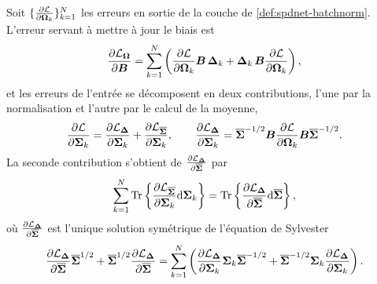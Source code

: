 \begin{proposition}
\label{prop:spdnet-batchnorm-backprop}
  Soit $\{\err{\loss}{\bnout_\iobs}\}_{\iobs=1}^{\Nobs}$ les erreurs en
  sortie de la couche de \cref{def:spdnet-batchnorm}. L'erreur servant à mettre
  à jour le biais est
  \begin{equation}
    \err{\loss_{\bnout}}{\Covbias}
    =
    \sum_{\iobs=1}^{\Nobs}
    \left(
      \err{\loss}{\bnout_\iobs}\Covbias\,\bnnorm_\iobs
      +
      \bnnorm_\iobs\,\Covbias\err{\loss}{\bnout_\iobs}
    \right),
    \label{eq:spdnet-backprop-biais}
  \end{equation}
  et les erreurs de l'entrée se décomposent en deux contributions, l'une par la
  normalisation et l'autre par le calcul de la moyenne,
  \begin{equation}
    \err{\loss}{\MCov_\iobs}
    =
    \err{\loss_{\bnnorm}}{\MCov_\iobs}
    +
    \err{\loss_{\Fmean}}{\MCov_\iobs},
    \qquad
    \err{\loss_{\bnnorm}}{\MCov_\iobs}
    =
    \Fmean^{-1/2}\Covbias\err{\loss}{\bnout_\iobs}\Covbias\Fmean^{-1/2}.
    \label{eq:spdnet-backprop-entree}
  \end{equation}
  La seconde contribution s'obtient de $\err{\loss_{\bnnorm}}{\Fmean}$ par
  \begin{equation}
    \sum_{\iobs=1}^{\Nobs}\trace{\err{\loss_{\Fmean}}{\MCov_\iobs}\diff\MCov_\iobs}
    =
    \trace{\err{\loss_{\bnnorm}}{\Fmean}\diff\Fmean},
    \label{eq:spdnet-backprop-moyenne}
  \end{equation}
  où $\err{\loss_{\bnnorm}}{\Fmean}$ est l'unique solution symétrique de
  l'équation de Sylvester
  \begin{equation}
    \err{\loss_{\bnnorm}}{\Fmean}\Fmean^{1/2}
    +
    \Fmean^{1/2}\err{\loss_{\bnnorm}}{\Fmean}
    =
    \sum_{\iobs=1}^{\Nobs}
    \left(
      \err{\loss_{\bnnorm}}{\MCov_\iobs}\MCov_\iobs\Fmean^{-1/2}
      +
      \Fmean^{-1/2}\MCov_\iobs\err{\loss_{\bnnorm}}{\MCov_\iobs}
    \right).
    \label{eq:spdnet-backprop-sylvester}
  \end{equation}
\end{proposition}


